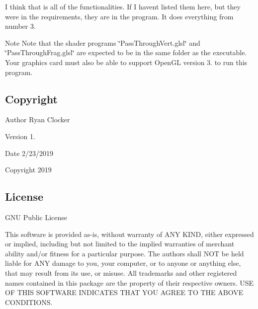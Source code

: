 I think that is all of the functionalities. If I havent listed them here, but they were in the requirements, they are in the program. It does everything from number 3.

\begin{DoxyNote}{Note}
Note that the shader programs \char`\"{}\+Pass\+Through\+Vert.\+glsl\char`\"{} and \char`\"{}\+Pass\+Through\+Frag.\+glsl\char`\"{} are expected to be in the same folder as the executable. Your graphics card must also be able to support Open\+GL version 3. to run this program.
\end{DoxyNote}


\hypertarget{index_copyright}{}\subsection{Copyright}\label{index_copyright}
\begin{DoxyAuthor}{Author}
Ryan Clocker 
\end{DoxyAuthor}
\begin{DoxyVersion}{Version}
1. 
\end{DoxyVersion}
\begin{DoxyDate}{Date}
2/23/2019 
\end{DoxyDate}
\begin{DoxyCopyright}{Copyright}
2019
\end{DoxyCopyright}


\hypertarget{index_license}{}\subsection{License}\label{index_license}
G\+NU Public License

This software is provided as-\/is, without warranty of A\+NY K\+I\+ND, either expressed or implied, including but not limited to the implied warranties of merchant ability and/or fitness for a particular purpose. The authors shall N\+OT be held liable for A\+NY damage to you, your computer, or to anyone or anything else, that may result from its use, or misuse. All trademarks and other registered names contained in this package are the property of their respective owners. U\+SE OF T\+H\+IS S\+O\+F\+T\+W\+A\+RE I\+N\+D\+I\+C\+A\+T\+ES T\+H\+AT Y\+OU A\+G\+R\+EE TO T\+HE A\+B\+O\+VE C\+O\+N\+D\+I\+T\+I\+O\+NS. 